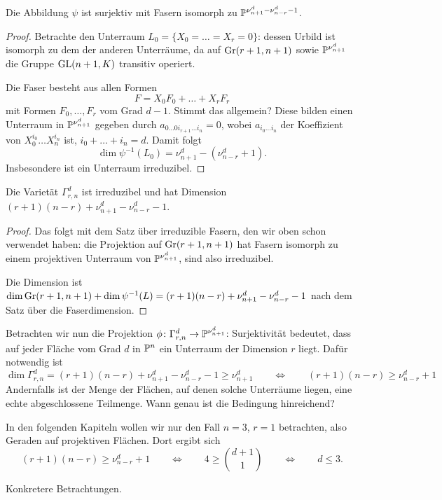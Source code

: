 \begin{prop}
Die Abbildung $\psi$ ist surjektiv mit Fasern isomorph zu $\mathbb P^{\nu_{n+1}^d - \nu_{n-r}^d - 1}$.
\end{prop}
\begin{proof}
Betrachte den Unterraum $L_0 = \{X_0 = \dots = X_r = 0\}$: dessen Urbild ist isomorph zu dem der anderen Unterräume, da auf $\grass r+1/{n+1}$ sowie $\mathbb P^{\nu_{n+1}^d}$ die Gruppe $\mathrm{GL}(n+1,K)$ transitiv operiert.

Die Faser besteht aus allen Formen
\begin{equation*}
F = X_0 F_0 + \dots + X_r F_r
\end{equation*}
mit Formen $F_0, \dots, F_r$ vom Grad $d-1$. \note Stimmt das allgemein? Diese bilden einen Unterraum in $\mathbb P^{\nu_{n+1}^d}$ gegeben durch $a_{0 \dots 0 i_{r+1} \dots i_n} = 0$, wobei $a_{i_0 \dots i_n}$ der Koeffizient von $X_0^{i_0} \dots X_n^{i_n}$ ist, $i_0 + \dots + i_n = d$. Damit folgt
\begin{equation*}
\dim \psi^{-1}(L_0) = \nu_{n+1}^d - (\nu_{n-r}^d + 1).
\end{equation*}
Insbesondere ist ein Unterraum irreduzibel.
\end{proof}

\begin{coroll}
Die Varietät $\Gamma_{r,n}^d$ ist irreduzibel und hat Dimension $(r+1)(n-r) + \nu_{n+1}^d - \nu_{n-r}^d - 1$.
\end{coroll}
\begin{proof}
Das folgt mit dem Satz über irreduzible Fasern, den wir oben schon verwendet haben: die Projektion auf $\grass r+1/{n+1}$ hat Fasern isomorph zu einem projektiven Unterraum von $\mathbb P^{\nu_{n+1}^d}$, sind also irreduzibel.

Die Dimension ist $\dim \grass r+1/{n+1} + \dim \psi^{-1}(L) = (r+1)(n-r) + \nu_{n+1}^d - \nu_{n-r}^d - 1$ nach dem Satz über die Faserdimension.
\end{proof}

Betrachten wir nun die Projektion $\phi \colon \Gamma_{r,n}^d \rightarrow \mathbb P^{\nu_{n+1}^d}$: Surjektivität bedeutet, dass auf jeder Fläche vom Grad $d$ in $\mathbb P^{n}$ ein Unterraum der Dimension $r$ liegt. Dafür notwendig ist
\begin{equation}
\dim \Gamma_{r,n}^d = (r+1)(n-r) + \nu_{n+1}^d - \nu_{n-r}^d - 1 \geq \nu_{n+1}^d \qquad \Leftrightarrow \qquad (r+1)(n-r) \geq \nu_{n-r}^d + 1
\end{equation}
Andernfalls ist der Menge der Flächen, auf denen solche Unterräume liegen, eine echte abgeschlossene Teilmenge. \note Wann genau ist die Bedingung hinreichend?

In den folgenden Kapiteln wollen wir nur den Fall $n=3$, $r=1$ betrachten, also Geraden auf projektiven Flächen. Dort ergibt sich
\begin{equation}
(r+1)(n-r) \geq \nu_{n-r}^d + 1 \qquad \Leftrightarrow \qquad 4 \geq \binom{d+1}{1} \qquad \Leftrightarrow \qquad d \leq 3.
\end{equation}

\todo Konkretere Betrachtungen.
